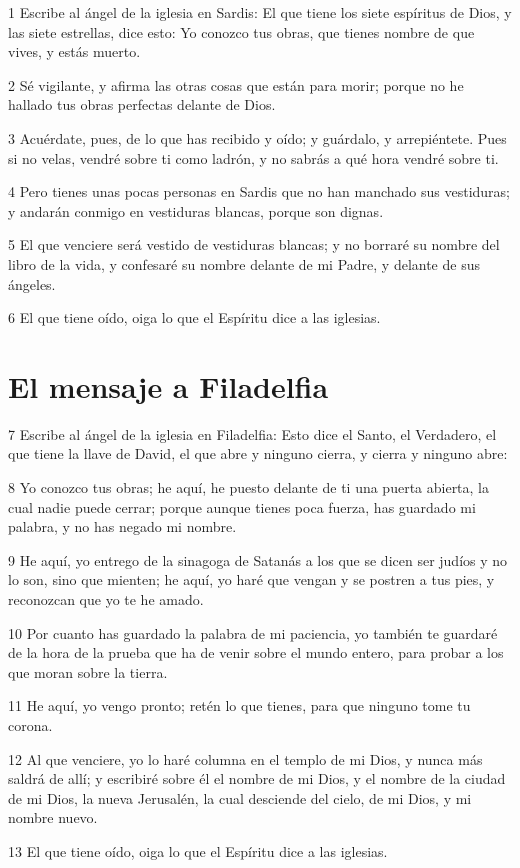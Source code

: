 \par 1 Escribe al ángel de la iglesia en Sardis: El que tiene los siete espíritus de Dios, y las siete estrellas, dice esto: Yo conozco tus obras, que tienes nombre de que vives, y estás muerto.
\par 2 Sé vigilante, y afirma las otras cosas que están para morir; porque no he hallado tus obras perfectas delante de Dios.
\par 3 Acuérdate, pues, de lo que has recibido y oído; y guárdalo, y arrepiéntete. Pues si no velas, vendré sobre ti como ladrón, y no sabrás a qué hora vendré sobre ti.
\par 4 Pero tienes unas pocas personas en Sardis que no han manchado sus vestiduras; y andarán conmigo en vestiduras blancas, porque son dignas.
\par 5 El que venciere será vestido de vestiduras blancas; y no borraré su nombre del libro de la vida, y confesaré su nombre delante de mi Padre, y delante de sus ángeles.
\par 6 El que tiene oído, oiga lo que el Espíritu dice a las iglesias.

\section*{El mensaje a Filadelfia}

\par 7 Escribe al ángel de la iglesia en Filadelfia: Esto dice el Santo, el Verdadero, el que tiene la llave de David, el que abre y ninguno cierra, y cierra y ninguno abre:
\par 8 Yo conozco tus obras; he aquí, he puesto delante de ti una puerta abierta, la cual nadie puede cerrar; porque aunque tienes poca fuerza, has guardado mi palabra, y no has negado mi nombre.
\par 9 He aquí, yo entrego de la sinagoga de Satanás a los que se dicen ser judíos y no lo son, sino que mienten; he aquí, yo haré que vengan y se postren a tus pies, y reconozcan que yo te he amado.
\par 10 Por cuanto has guardado la palabra de mi paciencia, yo también te guardaré de la hora de la prueba que ha de venir sobre el mundo entero, para probar a los que moran sobre la tierra.
\par 11 He aquí, yo vengo pronto; retén lo que tienes, para que ninguno tome tu corona.
\par 12 Al que venciere, yo lo haré columna en el templo de mi Dios, y nunca más saldrá de allí; y escribiré sobre él el nombre de mi Dios, y el nombre de la ciudad de mi Dios, la nueva Jerusalén, la cual desciende del cielo, de mi Dios, y mi nombre nuevo.
\par 13 El que tiene oído, oiga lo que el Espíritu dice a las iglesias.

